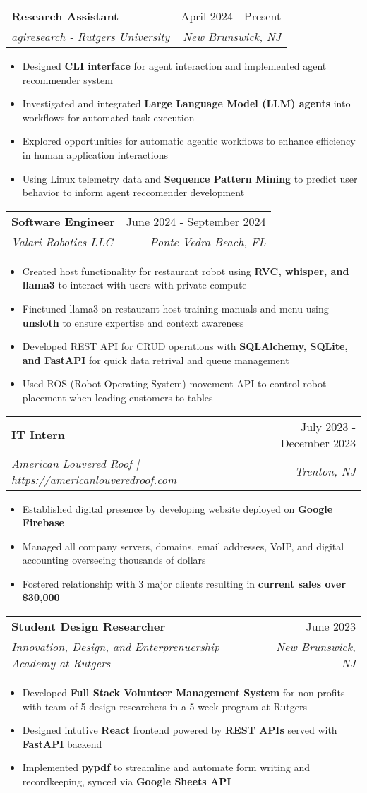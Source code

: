 \documentclass[letterpaper,10pt]{article}
\makeatletter
\newcommand{\resumeItem}[1]{
  \item\small{
    {#1 \vspace{-2pt}}
  }
}
\newcommand{\resumeSubheading}[4]{
  \vspace{-2pt}\item
    \begin{tabular*}{0.97\textwidth}[t]{l@{\extracolsep{\fill}}r}
      \textbf{#1} & #2 \\
      \textit{\small#3} & \textit{\small #4} \\
    \end{tabular*}\vspace{-7pt}
}
\newcommand{\resumeSubSubheading}[2]{
    \item
    \begin{tabular*}{0.97\textwidth}{l@{\extracolsep{\fill}}r}
      \textit{\small#1} & \textit{\small #2} \\
    \end{tabular*}\vspace{-7pt}
}
\newcommand{\resumeSubHeadingListEnd}{\end{itemize}}
\newcommand{\resumeItemListStart}{\begin{itemize}}
\newcommand{\resumeItemListEnd}{\end{itemize}\vspace{-5pt}}
\makeatother
\begin{document}
      
    \resumeSubheading
      {Research Assistant}{April 2024 - Present}
      {agiresearch - Rutgers University}{New Brunswick, NJ}
      \resumeItemListStart
	\resumeItem{Designed \textbf{CLI interface} for agent interaction and implemented agent recommender system}
	\resumeItem{Investigated and integrated \textbf{Large Language Model (LLM) agents} into workflows for automated task execution}
	\resumeItem{Explored opportunities for automatic agentic workflows to enhance efficiency in human application interactions}
	\resumeItem{Using Linux telemetry data and \textbf{Sequence Pattern Mining} to predict user behavior to inform agent reccomender development}
    \resumeItemListEnd

    \resumeSubheading
      {Software Engineer}{June 2024 - September 2024}
      {Valari Robotics LLC}{Ponte Vedra Beach, FL}
      \resumeItemListStart
	\resumeItem{Created host functionality for restaurant robot using \textbf{RVC, whisper, and llama3} to interact with users with private compute}
        \resumeItem{Finetuned llama3 on restaurant host training manuals and menu using \textbf{unsloth} to ensure expertise and context awareness}
	\resumeItem{Developed REST API for CRUD operations with \textbf{SQLAlchemy, SQLite, and FastAPI} for quick data retrival and queue management}
        \resumeItem{Used ROS (Robot Operating System) movement API to control robot placement when leading customers to tables}
    \resumeItemListEnd

    \resumeSubheading
      {IT Intern}{July 2023 - December 2023}
      {American Louvered Roof  | https://americanlouveredroof.com}{Trenton, NJ}
      \resumeItemListStart
      \resumeItem{Established digital presence by developing website deployed on \textbf{Google Firebase}}
        \resumeItem{Managed all company servers, domains, email addresses, VoIP, and digital accounting overseeing thousands of dollars}
        \resumeItem{Fostered relationship with 3 major clients resulting in \textbf{current sales over \$30,000}}
    \resumeItemListEnd

    \resumeSubheading
      {Student Design Researcher}{June 2023}
      {Innovation, Design, and Enterprenuership Academy at Rutgers}{New Brunswick, NJ}
      \resumeItemListStart
      \resumeItem{Developed \textbf{Full Stack Volunteer Management System} for non-profits with team of 5 design researchers in a 5 week program at Rutgers}
      \resumeItem{Designed intutive \textbf{React} frontend powered by \textbf{REST APIs} served with \textbf{FastAPI} backend}
      \resumeItem{Implemented \textbf{pypdf} to streamline and automate form writing and recordkeeping, synced via \textbf{Google Sheets API}}
      \resumeItemListEnd
\end{document}
